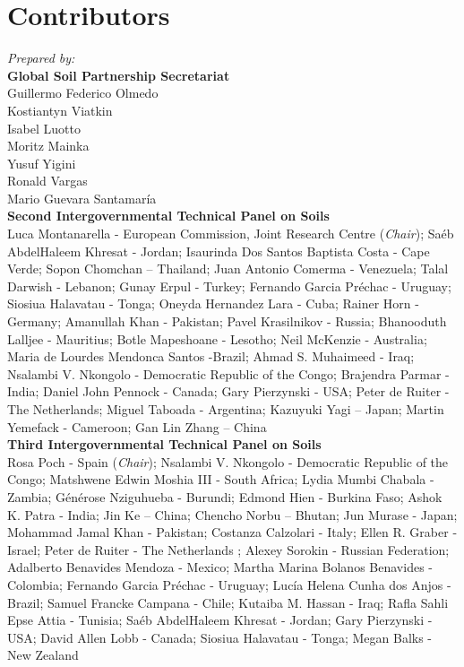 \documentclass[
  10pt,
  b5paper,
  oneside]{book}
\theoremstyle{definition}
\theoremstyle{definition}
\theoremstyle{definition}
\theoremstyle{definition}
\theoremstyle{remark}
\begin{document}
\hypertarget{contributors}{%
\chapter*{Contributors}\label{contributors}}

\emph{Prepared by:}\\
\textbf{Global Soil Partnership Secretariat}\\
Guillermo Federico Olmedo\\
Kostiantyn Viatkin\\
Isabel Luotto\\
Moritz Mainka\\
Yusuf Yigini\\
Ronald Vargas\\
Mario Guevara Santamaría\\

\textbf{Second Intergovernmental Technical Panel on Soils}\\
Luca Montanarella - European Commission, Joint Research Centre
(\emph{Chair}); Saéb AbdelHaleem Khresat - Jordan; Isaurinda Dos Santos
Baptista Costa - Cape Verde; Sopon Chomchan -- Thailand; Juan Antonio
Comerma - Venezuela; Talal Darwish - Lebanon; Gunay Erpul - Turkey;
Fernando Garcia Préchac - Uruguay; Siosiua Halavatau - Tonga; Oneyda
Hernandez Lara - Cuba; Rainer Horn - Germany; Amanullah Khan - Pakistan;
Pavel Krasilnikov - Russia; Bhanooduth Lalljee - Mauritius; Botle
Mapeshoane - Lesotho; Neil McKenzie - Australia; Maria de Lourdes
Mendonca Santos -Brazil; Ahmad S. Muhaimeed - Iraq; Nsalambi V.
Nkongolo - Democratic Republic of the Congo; Brajendra Parmar - India;
Daniel John Pennock - Canada; Gary Pierzynski - USA; Peter de Ruiter -
The Netherlands; Miguel Taboada - Argentina; Kazuyuki Yagi -- Japan;
Martin Yemefack - Cameroon; Gan Lin Zhang -- China\\

\textbf{Third Intergovernmental Technical Panel on Soils}\\
Rosa Poch - Spain (\emph{Chair}); Nsalambi V. Nkongolo - Democratic Republic
of the Congo; Matshwene Edwin Moshia III - South Africa; Lydia Mumbi
Chabala - Zambia; Générose Nziguhueba - Burundi; Edmond Hien - Burkina
Faso; Ashok K. Patra - India; Jin Ke -- China; Chencho Norbu -- Bhutan;
Jun Murase - Japan; Mohammad Jamal Khan - Pakistan; Costanza Calzolari -
Italy; Ellen R. Graber - Israel; Peter de Ruiter - The Netherlands ;
Alexey Sorokin - Russian Federation; Adalberto Benavides Mendoza -
Mexico; Martha Marina Bolanos Benavides - Colombia; Fernando Garcia
Préchac - Uruguay; Lucía Helena Cunha dos Anjos - Brazil; Samuel Francke
Campana - Chile; Kutaiba M. Hassan - Iraq; Rafla Sahli Epse Attia -
Tunisia; Saéb AbdelHaleem Khresat - Jordan; Gary Pierzynski - USA; David
Allen Lobb - Canada; Siosiua Halavatau - Tonga; Megan Balks - New
Zealand\\
\end{document}
